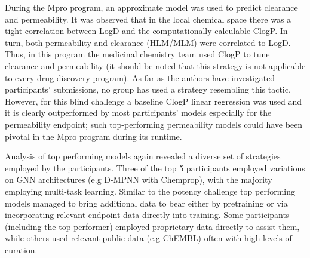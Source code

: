 \documentclass[journal=jcim,manuscript=article]{achemso}
\begin{document}
During the Mpro program, an approximate model was used to predict clearance and permeability. It was observed that in the local chemical space there was a tight correlation between LogD and the computationally calculable ClogP. In turn, both permeability and clearance (HLM/MLM) were correlated to LogD. Thus, in this program the medicinal chemistry team used ClogP to tune clearance and permeability (it should be noted that this strategy is not applicable to every drug discovery program). As far as the authors have investigated participants' submissions, no group has used a strategy resembling this tactic. However, for this blind challenge a baseline ClogP linear regression was used and it is clearly outperformed by most participants' models especially for the permeability endpoint; such top-performing permeability models could have been pivotal in the Mpro program during its runtime. 

Analysis of top performing models again revealed a diverse set of strategies employed by the participants. Three of the top 5 participants employed variations on GNN architectures (e.g D-MPNN with Chemprop), with the majority employing multi-task learning. Similar to the potency challenge top performing models managed to bring additional data to bear either by pretraining or via incorporating relevant endpoint data directly into training. Some participants (including the top performer) employed proprietary data directly to assist them, while others used relevant public data (e.g ChEMBL) often with high levels of curation.
\end{document}
